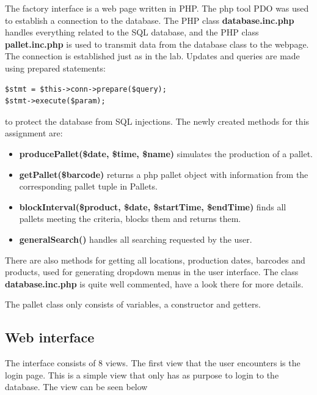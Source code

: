 \documentclass[a4paper]{scrartcl}
\numberwithin{equation}{section}
\begin{document}
The factory interface is a web page written in PHP. 
The php tool PDO was used to establish a connection to the database. 
The PHP class \textbf{database.inc.php} handles everything related to the SQL database, and the PHP class \textbf{pallet.inc.php} is used to transmit data from the database class to the webpage.
The connection is established just as in the lab.
Updates and queries are made using prepared statements:
\begin{verbatim}
$stmt = $this->conn->prepare($query);
$stmt->execute($param);
\end{verbatim}
to protect the database from SQL injections. 
The newly created methods for this assignment are:
\begin{itemize}
  \item \textbf{producePallet(\$date, \$time, \$name)} simulates the production of a pallet.
  \item \textbf{getPallet(\$barcode)} returns a php pallet object with information from the corresponding pallet tuple in Pallets.
  \item \textbf{blockInterval(\$product, \$date, \$startTime, \$endTime)} finds all pallets meeting the criteria, blocks them and returns them.
  \item \textbf{generalSearch()} handles all searching requested by the user.
\end{itemize}
There are also methods for getting all locations, production dates, barcodes and products, used for generating dropdown menus in the user interface. 
The class \textbf{database.inc.php} is quite well commented, have a look there for more details.

The pallet class only consists of variables, a constructor and getters.

\subsection*{Web interface}

The interface consists of 8 views. The first view that the user encounters is the login page. This is a simple view that only has as purpose to login to the database. The view can be seen below 
\end{document}
